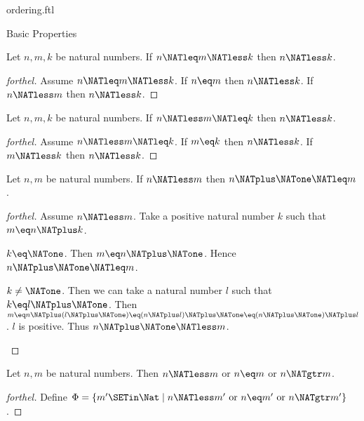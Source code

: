 \documentclass{naproche-library}
\begin{document}
\begin{smodule}[title=The Standard Ordering of the Natural Numbers]{ordering.ftl}
\begin{sfragment}{Basic Properties}
  \begin{proposition}[forthel,id=ARITHMETIC_04_5098403656630272]
    Let $n, m, k$ be natural numbers.
    If $n \NATleq m \NATless k$ then $n \NATless k$.
  \end{proposition}
  \begin{proof}[forthel]
    Assume $n \NATleq m \NATless k$.
    If $n \eq m$ then $n \NATless k$.
    If $n \NATless m$ then $n \NATless k$.
  \end{proof}

  \begin{proposition}[forthel,id=ARITHMETIC_04_4809599527944192]
    Let $n, m, k$ be natural numbers.
    If $n \NATless m \NATleq k$ then $n \NATless k$.
  \end{proposition}
  \begin{proof}[forthel]
    Assume $n \NATless m \NATleq k$.
    If $m \eq k$ then $n \NATless k$.
    If $m \NATless k$ then $n \NATless k$.
  \end{proof}

  \begin{proposition}[forthel,id=ARITHMETIC_04_8584998051381248]
    Let $n, m$ be natural numbers.
    If $n \NATless m$ then $n \NATplus \NATone \NATleq m$.
  \end{proposition}
  \begin{proof}[forthel]
    Assume $n \NATless m$.
    Take a positive natural number $k$ such that $m \eq n \NATplus k$.

    \begin{case}{$k \eq \NATone$.}
      Then $m \eq n \NATplus \NATone$.
      Hence $n \NATplus \NATone \NATleq m$.
    \end{case}

    \begin{case}{$k \neq \NATone$.}
      Then we can take a natural number $l$ such that $k \eq l \NATplus \NATone$.
      Then $m
        \eq n \NATplus (l \NATplus \NATone)
        \eq (n \NATplus l) \NATplus \NATone
        \eq (n \NATplus \NATone) \NATplus l$.
      $l$ is positive.
      Thus $n \NATplus \NATone \NATless m$.
    \end{case}
  \end{proof}

  \begin{proposition}[forthel,id=ARITHMETIC_04_8201937860165632]
    Let $n, m$ be natural numbers.
    Then $n \NATless m$ or $n \eq m$ or $n \NATgtr m$.
  \end{proposition}
  \begin{proof}[forthel]
    Define $\Phi = \{ m' \SETin \Nat \mid n \NATless m'\text{ or }n \eq m'\text{ or }n \NATgtr m' \}$.


\end{proof}
\end{sfragment}
\end{smodule}
\end{document}
